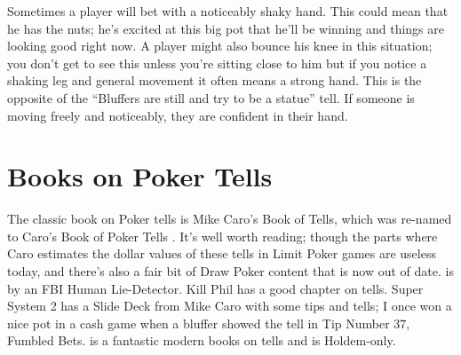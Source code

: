 Sometimes a player will bet with a noticeably shaky hand. This could
mean that he has the nuts; he's excited at this big pot that he'll be
winning and things are looking good right now. A player might also
bounce his knee in this situation; you don't get to see this unless
you're sitting close to him but if you notice a shaking leg and
general movement it often means a strong hand. This is the opposite of
the ``Bluffers are still and try to be a statue'' tell. If someone is
moving freely and noticeably, they are confident in their hand.

\section{Books on Poker Tells}


The classic book on Poker tells is Mike Caro's Book of Tells, which
was re-named to Caro's Book of Poker Tells \citep{CaroTells}. It's well
worth reading; though the parts where Caro estimates the dollar values
of these tells in Limit Poker games are useless today, and there's
also a fair bit of Draw Poker content that is now out of date.
\citep{Navarro} is by an FBI Human Lie-Detector. Kill Phil has a
good chapter on tells. Super System 2 has a Slide Deck from Mike Caro
with some tips and  tells; I once won a nice pot in a cash game when
a bluffer showed the tell in Tip Number 37, Fumbled Bets.
\citep{Elwood} is a fantastic modern books on tells and is Holdem-only.
